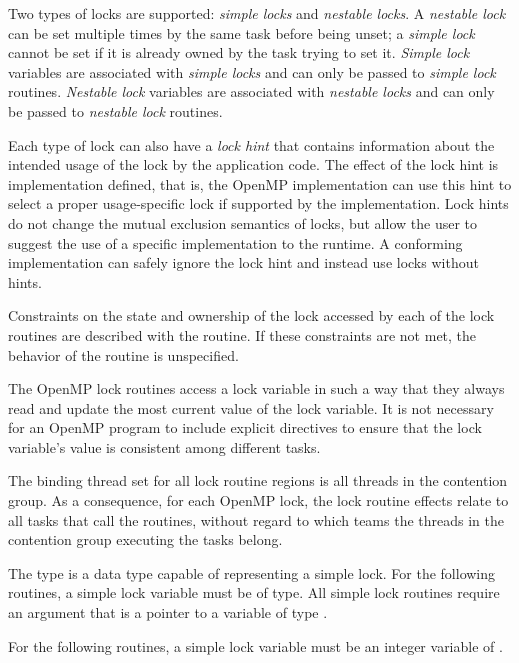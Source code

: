 Two types of locks are supported: \emph{simple locks} and \emph{nestable locks}. A \emph{nestable lock} can 
be set multiple times by the same task before being unset; a \emph{simple lock} cannot be set if 
it is already owned by the task trying to set it. \emph{Simple lock} variables are associated with 
\emph{simple locks} and can only be passed to \emph{simple lock} routines. \emph{Nestable lock} variables are 
associated with \emph{nestable locks} and can only be passed to \emph{nestable lock} routines.

Each type of lock can also have a \emph{lock hint} that contains information about the intended usage 
of the lock by the application code.  The effect of the lock hint is implementation defined, 
that is, the OpenMP implementation can use this hint to select a proper 
usage-specific lock if supported by the implementation.  
Lock hints do not change the mutual exclusion semantics of locks, but allow the 
user to suggest the use of a specific implementation to the runtime.
A conforming implementation can safely ignore the lock hint and instead use locks without hints.

Constraints on the state and ownership of the lock accessed by each of the lock routines 
are described with the routine. If these constraints are not met, the behavior of the 
routine is unspecified. 

The OpenMP lock routines access a lock variable in such a way that they always read 
and update the most current value of the lock variable. It is not necessary for an 
OpenMP program to include explicit  directives to ensure that the lock variable’s 
value is consistent among different tasks. 

\binding
The binding thread set for all lock routine regions is all threads in the contention group. 
As a consequence, for each OpenMP lock, the lock routine effects relate to all tasks that 
call the routines, without regard to which teams the threads in the contention group 
executing the tasks belong.

\ccppspecificstart
The type  is a data type capable of representing a simple lock. For the 
following routines, a simple lock variable must be of  type. All simple 
lock routines require an argument that is a pointer to a variable of type .
\ccppspecificend

\fortranspecificstart
For the following routines, a simple lock variable must be an integer variable of 
.
\fortranspecificend


